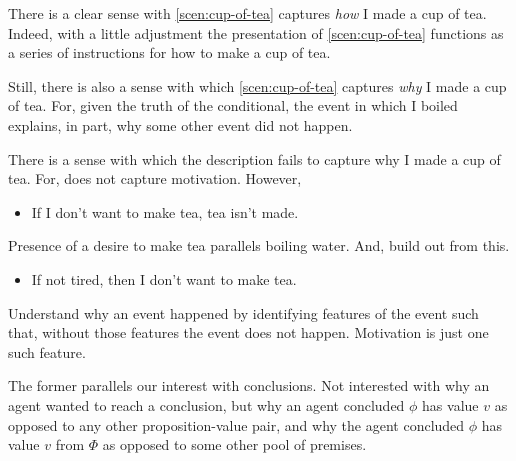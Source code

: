 \begin{note}
  There is a clear sense with \autoref{scen:cup-of-tea} captures \emph{how} I made a cup of tea.
  Indeed, with a little adjustment the presentation of \autoref{scen:cup-of-tea} functions as a series of instructions for how to make a cup of tea.

  Still, there is also a sense with which \autoref{scen:cup-of-tea} captures \emph{why} I made a cup of tea.
  For, given the truth of the conditional, the event in which I boiled explains, in part, why some other event did not happen.

  There is a sense with which the description fails to capture why I made a cup of tea.
  For, does not capture motivation.
  However,

  \begin{itemize}
  \item
    If I don't want to make tea, tea isn't made.
  \end{itemize}

  Presence of a desire to make tea parallels boiling water.
  And, build out from this.

  \begin{itemize}
  \item
    If not tired, then I don't want to make tea.
  \end{itemize}

  Understand why an event happened by identifying features of the event such that, without those features the event does not happen.
  Motivation is just one such feature.
\end{note}

\begin{note}
The former parallels our interest with conclusions.
  Not interested with why an agent wanted to reach a conclusion, but why an agent concluded \(\phi\) has value \(v\) as opposed to any other proposition-value pair, and why the agent concluded \(\phi\) has value \(v\) from \(\Phi\) as opposed to some other pool of premises.
\end{note}

